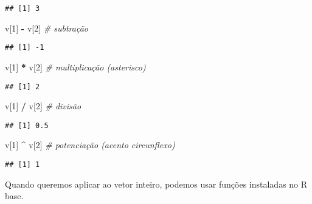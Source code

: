\documentclass[
]{book}
\newenvironment{Shaded}{\begin{snugshade}}{\end{snugshade}}
\newcommand{\CommentTok}[1]{\textcolor[rgb]{0.56,0.35,0.01}{\textit{#1}}}
\newcommand{\DecValTok}[1]{\textcolor[rgb]{0.00,0.00,0.81}{#1}}
\newcommand{\NormalTok}[1]{#1}
\newcommand{\OperatorTok}[1]{\textcolor[rgb]{0.81,0.36,0.00}{\textbf{#1}}}
\newcommand{\StringTok}[1]{\textcolor[rgb]{0.31,0.60,0.02}{#1}}
\begin{document}
\begin{verbatim}
## [1] 3
\end{verbatim}

\begin{Shaded}
\begin{Highlighting}[]
\NormalTok{v[}\DecValTok{1}\NormalTok{] }\OperatorTok{-}\StringTok{ }\NormalTok{v[}\DecValTok{2}\NormalTok{] }\CommentTok{# subtração}
\end{Highlighting}
\end{Shaded}

\begin{verbatim}
## [1] -1
\end{verbatim}

\begin{Shaded}
\begin{Highlighting}[]
\NormalTok{v[}\DecValTok{1}\NormalTok{] }\OperatorTok{*}\StringTok{ }\NormalTok{v[}\DecValTok{2}\NormalTok{] }\CommentTok{# multiplicação (asterisco)}
\end{Highlighting}
\end{Shaded}

\begin{verbatim}
## [1] 2
\end{verbatim}

\begin{Shaded}
\begin{Highlighting}[]
\NormalTok{v[}\DecValTok{1}\NormalTok{] }\OperatorTok{/}\StringTok{ }\NormalTok{v[}\DecValTok{2}\NormalTok{] }\CommentTok{# divisão}
\end{Highlighting}
\end{Shaded}

\begin{verbatim}
## [1] 0.5
\end{verbatim}

\begin{Shaded}
\begin{Highlighting}[]
\NormalTok{v[}\DecValTok{1}\NormalTok{] }\OperatorTok{^}\StringTok{ }\NormalTok{v[}\DecValTok{2}\NormalTok{] }\CommentTok{# potenciação (acento circunflexo)}
\end{Highlighting}
\end{Shaded}

\begin{verbatim}
## [1] 1
\end{verbatim}

Quando queremos aplicar ao vetor inteiro, podemos usar funções instaladas no R base.
\end{document}
